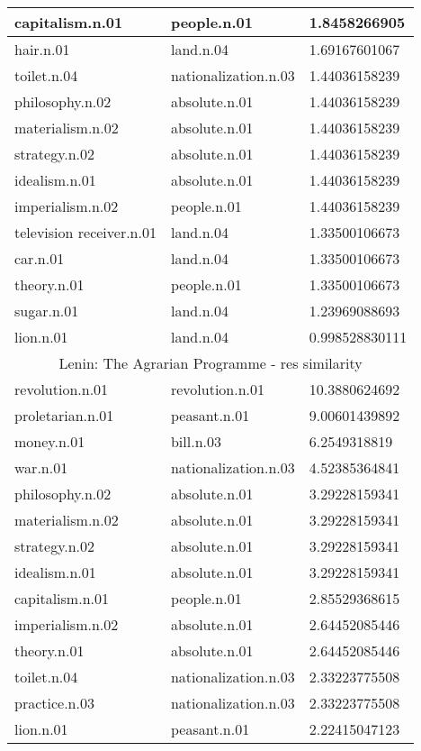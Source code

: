\begin{center}
\begin{tabular}{ | l | l | l |}
capitalism.n.01 & people.n.01 & 1.8458266905\\ \hline
hair.n.01 & land.n.04 & 1.69167601067\\ \hline
toilet.n.04 & nationalization.n.03 & 1.44036158239\\ \hline
philosophy.n.02 & absolute.n.01 & 1.44036158239\\ \hline
materialism.n.02 & absolute.n.01 & 1.44036158239\\ \hline
strategy.n.02 & absolute.n.01 & 1.44036158239\\ \hline
idealism.n.01 & absolute.n.01 & 1.44036158239\\ \hline
imperialism.n.02 & people.n.01 & 1.44036158239\\ \hline
television receiver.n.01 & land.n.04 & 1.33500106673\\ \hline
car.n.01 & land.n.04 & 1.33500106673\\ \hline
theory.n.01 & people.n.01 & 1.33500106673\\ \hline
sugar.n.01 & land.n.04 & 1.23969088693\\ \hline
lion.n.01 & land.n.04 & 0.998528830111\\ \hline
\multicolumn{3}{|c|}{Lenin: The Agrarian Programme  - res similarity} \\ \hline
revolution.n.01 & revolution.n.01 & 10.3880624692\\ \hline
proletarian.n.01 & peasant.n.01 & 9.00601439892\\ \hline
money.n.01 & bill.n.03 & 6.2549318819\\ \hline
war.n.01 & nationalization.n.03 & 4.52385364841\\ \hline
philosophy.n.02 & absolute.n.01 & 3.29228159341\\ \hline
materialism.n.02 & absolute.n.01 & 3.29228159341\\ \hline
strategy.n.02 & absolute.n.01 & 3.29228159341\\ \hline
idealism.n.01 & absolute.n.01 & 3.29228159341\\ \hline
capitalism.n.01 & people.n.01 & 2.85529368615\\ \hline
imperialism.n.02 & absolute.n.01 & 2.64452085446\\ \hline
theory.n.01 & absolute.n.01 & 2.64452085446\\ \hline
toilet.n.04 & nationalization.n.03 & 2.33223775508\\ \hline
practice.n.03 & nationalization.n.03 & 2.33223775508\\ \hline
lion.n.01 & peasant.n.01 & 2.22415047123\\ \hline

\end{tabular}
\end{center}
